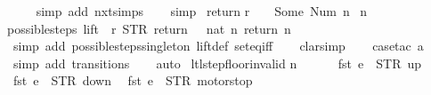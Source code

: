 \begin{isabellebody}
\ \ \ \isamarkupfalse%
\ {\isacharparenleft}simp\ add{\isacharcolon}\ nxt{\isachardot}simps{\isacharparenright}\isanewline
\ \ \isamarkupfalse%
\ simp%
\endisatagproof
{\isafoldproof}%
%
\isadelimproof
\isanewline
%
\endisadelimproof
\isanewline
{}\isamarkupfalse%
\ return{\isacharcolon}\isanewline
{\isachardoublequoteopen}r\ {\isachardollar}\ {}\ {\isacharequal}\ Some\ {\isacharparenleft}Num\ n{\isacharparenright}\ {\isasymLongrightarrow}\isanewline
n\ {\isasymin}\ {\isacharbraceleft}{}{\isacharcomma}\ {}{\isacharcomma}\ {}{\isacharcomma}\ {}{\isacharbraceright}\ {\isasymLongrightarrow}\isanewline
possible{\isacharunderscore}steps\ lift\ {}\ r\ {\isacharparenleft}STR\ {\isacharprime}{\isacharprime}return{\isacharprime}{\isacharprime}{\isacharparenright}\ {\isacharbrackleft}{\isacharbrackright}\ {\isacharequal}\ {\isacharbraceleft}{\isacharbar}{\isacharparenleft}nat\ n{\isacharcomma}\ return\ n{\isacharparenright}{\isacharbar}{\isacharbraceright}{\isachardoublequoteclose}\isanewline
%
\isadelimproof
\ \ %
\endisadelimproof
%
\isatagproof
{}\isamarkupfalse%
\ {\isacharparenleft}simp\ add{\isacharcolon}\ possible{\isacharunderscore}steps{\isacharunderscore}singleton\ lift{\isacharunderscore}def\ set{\isacharunderscore}eq{\isacharunderscore}iff{\isacharparenright}\isanewline
\ \ \isamarkupfalse%
\ clarsimp\isanewline
\ \ \isamarkupfalse%
\ {\isacharparenleft}case{\isacharunderscore}tac\ {\isachardoublequoteopen}a{\isacharequal}{}{\isachardoublequoteclose}{\isacharparenright}\isanewline
\ \ \ \isamarkupfalse%
\ {\isacharparenleft}simp\ add{\isacharcolon}\ transitions{\isacharparenright}\isanewline
\ \ \isamarkupfalse%
\ auto%
\endisatagproof
{\isafoldproof}%
%
\isadelimproof
\isanewline
%
\endisadelimproof
\isanewline
{}\isamarkupfalse%
\ ltl{\isacharunderscore}step{\isacharunderscore}floor{\isacharunderscore}invalid{\isacharcolon}\isanewline
{\isachardoublequoteopen}n\ {\isasymin}\ {\isacharbraceleft}{}{\isacharcomma}\ {}{\isacharcomma}\ {}{\isacharcomma}\ {}{\isacharbraceright}\ {\isasymLongrightarrow}\isanewline
fst\ e\ {\isasymnoteq}\ STR\ {\isacharprime}{\isacharprime}up{\isacharprime}{\isacharprime}\ {\isasymLongrightarrow}\isanewline
\ fst\ e\ {\isasymnoteq}\ STR\ {\isacharprime}{\isacharprime}down{\isacharprime}{\isacharprime}\ {\isasymLongrightarrow}\isanewline
\ fst\ e\ {\isasymnoteq}\ STR\ {\isacharprime}{\isacharprime}motorstop{\isacharprime}{\isacharprime}\ {\isasymLongrightarrow}\isanewline

\end{isabellebody}
